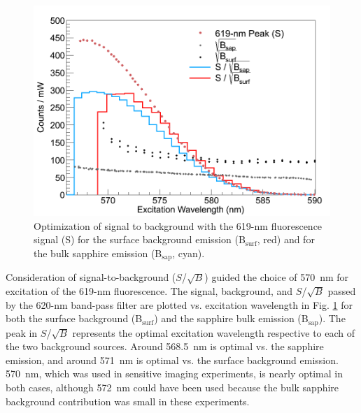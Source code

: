 \begin{figure} %
        \centering
                \includegraphics[width=.7\textwidth]{figures/S_to_B_both.png}
                \caption{Optimization of signal to background with the 619-nm fluorescence signal (S) for the surface background emission (B$_{\text{surf}}$, red) and for the bulk sapphire emission (B$_{\text{sap}}$, cyan).}
        \label{fig:StoB}
\end{figure}

Consideration of signal-to-background ($S$/$\sqrt{B}$) guided the choice of 570~nm for excitation of the 619-nm fluorescence.  The signal, background, and $S$/$\sqrt{B}$ passed by the 620-nm band-pass filter are plotted vs. excitation wavelength in Fig. \ref{fig:StoB} for both the surface background (B$_{\text{surf}}$) and the sapphire bulk emission (B$_{\text{sap}}$).  The peak in $S$/$\sqrt{B}$ represents the optimal excitation wavelength respective to each of the two background sources.  Around 568.5~nm is optimal vs. the sapphire emission, and around 571~nm is optimal vs. the surface background emission. 570~nm, which was used in sensitive imaging experiments, is nearly optimal in both cases, although 572~nm could have been used because the bulk sapphire background contribution was small in these experiments.